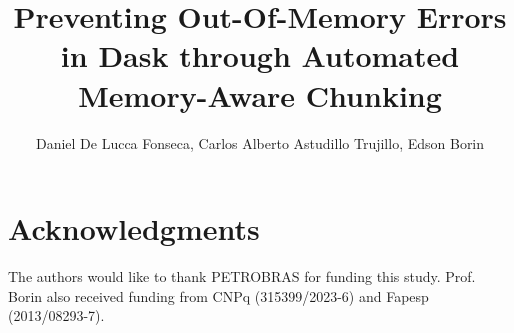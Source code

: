 \documentclass[12pt]{article}
\title{Preventing Out-Of-Memory Errors in Dask through Automated Memory-Aware Chunking}
\author{Daniel De Lucca Fonseca\inst{1}, Carlos Alberto Astudillo Trujillo\inst{1}, Edson Borin\inst{1}}
\begin{document}
\maketitle

\begin{abstract}

\end{abstract}








\section*{Acknowledgments}
\label{sec:ack}
The authors would like to thank PETROBRAS for funding this study. Prof. Borin also received funding from CNPq (315399/2023-6) and Fapesp (2013/08293-7).



\end{document}
